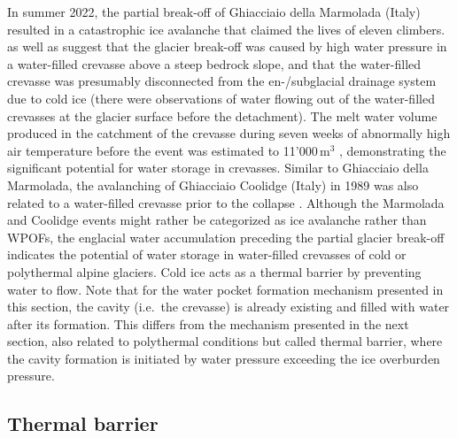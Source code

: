 In summer 2022, the partial break-off of Ghiacciaio della Marmolada (Italy) resulted in a catastrophic ice avalanche that claimed the lives of eleven climbers. \cite{Bondesan&Roberto2023} as well as \cite{Chiarle&al2023} suggest that the glacier break-off was caused by high water pressure in a water-filled crevasse above a steep bedrock slope, and that the water-filled crevasse was presumably disconnected from the en-/subglacial drainage system due to cold ice (there were observations of water flowing out of the water-filled crevasses at the glacier surface before the detachment). The melt water volume produced in the catchment of the crevasse during seven weeks of abnormally high air temperature before the event was estimated to 11'000\,m$^3$ \citep{Bondesan&Roberto2023}, demonstrating the significant potential for water storage in crevasses. Similar to Ghiacciaio della Marmolada, the avalanching of Ghiacciaio Coolidge (Italy) in 1989 was also related to a water-filled crevasse prior to the collapse \citep{Dutto&al1991,Chiarle&al2023}. Although the Marmolada and Coolidge events might rather be categorized as ice avalanche rather than WPOFs, the englacial water accumulation preceding the partial glacier break-off indicates the potential of water storage in water-filled crevasses of cold or polythermal alpine glaciers. Cold ice acts as a thermal barrier by preventing water to flow. Note that for the water pocket formation mechanism presented in this section, the cavity (i.e.\ the crevasse) is already existing and filled with water after its formation. This differs from the mechanism presented in the next section, also related to polythermal conditions but called thermal barrier, where the cavity formation is initiated by water pressure exceeding the ice overburden pressure. 


\subsection{ Thermal barrier}
\label{sec:thermal_barrier}

